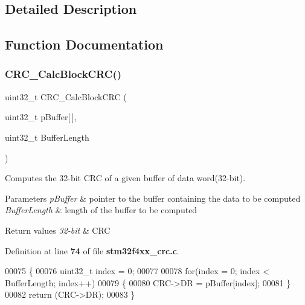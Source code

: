 \subsection{Detailed Description}


\subsection{Function Documentation}
\mbox{\label{group__CRC__Private__Functions_gab15ebf620615c360048fb4f45b15fae6}} 
\subsubsection{C\+R\+C\+\_\+\+Calc\+Block\+C\+R\+C()}
{\footnotesize\ttfamily uint32\+\_\+t C\+R\+C\+\_\+\+Calc\+Block\+C\+RC (\begin{DoxyParamCaption}\item[{uint32\+\_\+t}]{p\+Buffer[$\,$],  }\item[{uint32\+\_\+t}]{Buffer\+Length }\end{DoxyParamCaption})}



Computes the 32-\/bit C\+RC of a given buffer of data word(32-\/bit). 


\begin{DoxyParams}{Parameters}
{\em p\+Buffer} & pointer to the buffer containing the data to be computed \\
\hline
{\em Buffer\+Length} & length of the buffer to be computed \\
\hline
\end{DoxyParams}

\begin{DoxyRetVals}{Return values}
{\em 32-\/bit} & C\+RC \\
\hline
\end{DoxyRetVals}


Definition at line \textbf{ 74} of file \textbf{ stm32f4xx\+\_\+crc.\+c}.


\begin{DoxyCode}
00075 \{
00076   uint32\_t index = 0;
00077   
00078   \textcolor{keywordflow}{for}(index = 0; index < BufferLength; index++)
00079   \{
00080     CRC->DR = pBuffer[index];
00081   \}
00082   \textcolor{keywordflow}{return} (CRC->DR);
00083 \}
\end{DoxyCode}
\mbox{\label{group__CRC__Private__Functions_ga5407fdbb8e8c9be6322cc8856ae5db3b}} 
